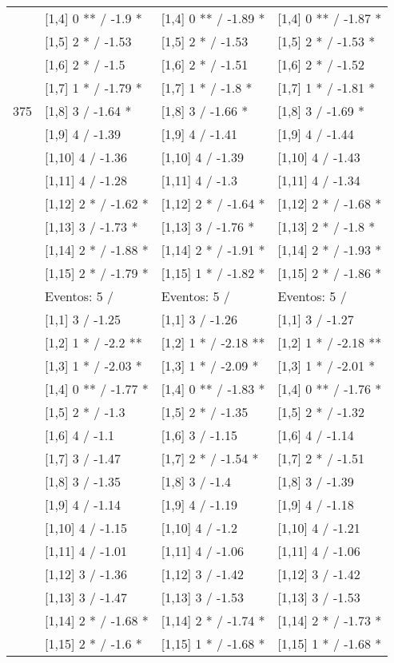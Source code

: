 \begin{table}
\begin{tabular}[t]{llll}
\addlinespace
 & {}[1,4] 0 ** / -1.9 * & {}[1,4] 0 ** / -1.89 * & {}[1,4] 0 ** / -1.87 *\\
 & {}[1,5] 2 * / -1.53 & {}[1,5] 2 * / -1.53 & {}[1,5] 2 * / -1.53 *\\
 & {}[1,6] 2 * / -1.5 & {}[1,6] 2 * / -1.51 & {}[1,6] 2 * / -1.52\\
 & {}[1,7] 1 * / -1.79 * & {}[1,7] 1 * / -1.8 * & {}[1,7] 1 * / -1.81 *\\
375 & {}[1,8] 3  / -1.64 * & {}[1,8] 3  / -1.66 * & {}[1,8] 3  / -1.69 *\\
\addlinespace
 & {}[1,9] 4  / -1.39 & {}[1,9] 4  / -1.41 & {}[1,9] 4  / -1.44\\
 & {}[1,10] 4  / -1.36 & {}[1,10] 4  / -1.39 & {}[1,10] 4  / -1.43\\
 & {}[1,11] 4  / -1.28 & {}[1,11] 4  / -1.3 & {}[1,11] 4  / -1.34\\
 & {}[1,12] 2 * / -1.62 * & {}[1,12] 2 * / -1.64 * & {}[1,12] 2 * / -1.68 *\\
 & {}[1,13] 3  / -1.73 * & {}[1,13] 3  / -1.76 * & {}[1,13] 2 * / -1.8 *\\
\addlinespace
 & {}[1,14] 2 * / -1.88 * & {}[1,14] 2 * / -1.91 * & {}[1,14] 2 * / -1.93 *\\
 & {}[1,15] 2 * / -1.79 * & {}[1,15] 1 * / -1.82 * & {}[1,15] 2 * / -1.86 *\\
 & Eventos:  5 / & Eventos:  5 / & Eventos:  5 /\\
 & {}[1,1] 3  / -1.25 & {}[1,1] 3  / -1.26 & {}[1,1] 3  / -1.27\\
 & {}[1,2] 1 * / -2.2 ** & {}[1,2] 1 * / -2.18 ** & {}[1,2] 1 * / -2.18 **\\
\addlinespace
 & {}[1,3] 1 * / -2.03 * & {}[1,3] 1 * / -2.09 * & {}[1,3] 1 * / -2.01 *\\
 & {}[1,4] 0 ** / -1.77 * & {}[1,4] 0 ** / -1.83 * & {}[1,4] 0 ** / -1.76 *\\
 & {}[1,5] 2 * / -1.3 & {}[1,5] 2 * / -1.35 & {}[1,5] 2 * / -1.32\\
 & {}[1,6] 4  / -1.1 & {}[1,6] 3  / -1.15 & {}[1,6] 4  / -1.14\\
 & {}[1,7] 3  / -1.47 & {}[1,7] 2 * / -1.54 * & {}[1,7] 2 * / -1.51\\
\addlinespace
500 & {}[1,8] 3  / -1.35 & {}[1,8] 3  / -1.4 & {}[1,8] 3  / -1.39\\
 & {}[1,9] 4  / -1.14 & {}[1,9] 4  / -1.19 & {}[1,9] 4  / -1.18\\
 & {}[1,10] 4  / -1.15 & {}[1,10] 4  / -1.2 & {}[1,10] 4  / -1.21\\
 & {}[1,11] 4  / -1.01 & {}[1,11] 4  / -1.06 & {}[1,11] 4  / -1.06\\
 & {}[1,12] 3  / -1.36 & {}[1,12] 3  / -1.42 & {}[1,12] 3  / -1.42\\
\addlinespace
 & {}[1,13] 3  / -1.47 & {}[1,13] 3  / -1.53 & {}[1,13] 3  / -1.53\\
 & {}[1,14] 2 * / -1.68 * & {}[1,14] 2 * / -1.74 * & {}[1,14] 2 * / -1.73 *\\
 & {}[1,15] 2 * / -1.6 * & {}[1,15] 1 * / -1.68 * & {}[1,15] 1 * / -1.68 *\\
\bottomrule
\end{tabular}
\end{table}
